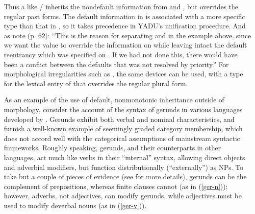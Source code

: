\documentclass[output=paper,biblatex,babelshorthands,newtxmath,draftmode,colorlinks,citecolor=brown]{langscibook}
\begin{document}
Thus a  like / inherits the nondefault information from  and , but overrides the regular past forms.
The default information in  is associated with a more specific type than that in , so it takes precedence in YADU's unification procedure.
And as \citeauthor{LC99a} note (p. 62): ``This is the reason for separating  and  in the example above, since we want the  value to override the  information on  while leaving intact the default reentrancy which was specified on .  If we had not done this, there would have been a conflict between the defaults that was not resolved by priority.'' For morphological irregularities such as , the same devices can be used, with a type for the lexical entry of  that overrides the regular plural form.

As an example of the use of default, nonmonotonic inheritance outside of morphology, consider the account of the syntax of gerunds in various languages developed by \citet{Malouf2000a}.
Gerunds exhibit both verbal and nominal characteristics, and furnish a well-known example of seemingly graded category membership, which does not accord well with the categorical assumptions of mainstream syntactic frameworks.
Roughly speaking,  gerunds, and their counterparts in other languages, act much like verbs in their ``internal'' syntax, allowing direct objects and adverbial modifiers, but function distributionally (``externally'') as NPs.
To take but a couple of pieces of evidence (see \citealt[27--33]{Malouf2000a} for more details), 
gerunds can be the complement of prepositions, whereas finite clauses cannot (as in (\ref{ger-n})); however, adverbs, not adjectives, can modify gerunds, while adjectives must be used to modify deverbal nouns (as in (\ref{ger-v})).


\eal
\label{ger-n}
\zl
\eal
\label{ger-v}
\zl
\end{document}
